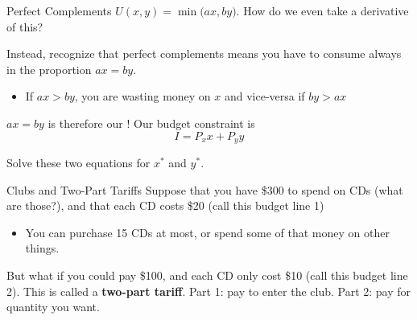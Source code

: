 \documentclass[12pt,t]{beamer}
\begin{document}
\begin{frame}{Perfect Complements}
  $U(x,y) = \min\big( ax, by \big)$. How do we even take a derivative of this?

  \pause\bigskip
  Instead, recognize that perfect complements means you have to consume always in the proportion $ax = by$. 
  \begin{itemize}
    \item If $ax > by$, you are wasting money on $x$ and vice-versa if $by > ax$
  \end{itemize}

  \pause\bigskip
  $ax = by$ is therefore our ! Our budget constraint is 
  $$
    I = P_x x + P_y y
  $$

  \bigskip
  Solve these two equations for $x^*$ and $y^*$.
\end{frame}

\begin{frame}{Clubs and Two-Part Tariffs}
  Suppose that you have \$300 to spend on CDs (what are those?), and that each CD costs \$20 (call this budget line 1)

  \begin{itemize}
    \item You can purchase 15 CDs at most, or spend some of that money on other things.
  \end{itemize}

  \bigskip
  But what if you could pay \$100, and each CD only cost \$10 (call this budget line 2). This is called a \textbf{two-part tariff}. Part 1: pay to enter the club. Part 2: pay for quantity you want.
\end{frame}
\end{document}
